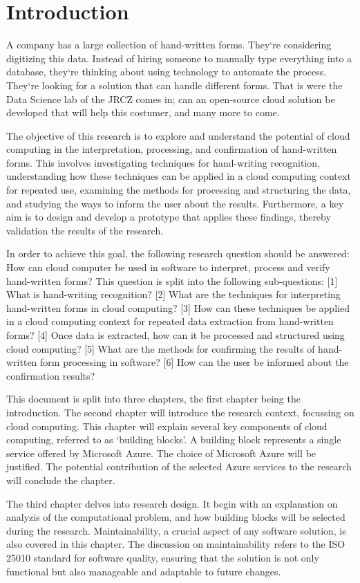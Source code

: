 \section{Introduction}

A company has a large collection of hand-written forms.
They`re considering digitizing this data.
Instead of hiring someone to manually type everything into a database,
they`re thinking about using technology to automate the process.
They`re looking for a solution that can handle different forms.
That is were the Data Science lab of the JRCZ comes in;
can an open-source cloud solution be developed that will help this costumer, and many more to come.

The objective of this research is to explore and understand the potential of cloud computing in the interpretation,
processing, and confirmation of hand-written forms.
This involves investigating techniques for hand-writing recognition,
understanding how these techniques can be applied in a cloud computing context for repeated use,
examining the methods for processing and structuring the data,
and studying the ways to inform the user about the results.
Furthermore, a key aim is to design and develop a prototype that applies these findings,
thereby validation the results of the research.

In order to achieve this goal, the following research question should be answered:
How can cloud computer be used in software to interpret, process and verify hand-written forms?
This question is split into the following sub-questions:
[1] What is hand-writing recognition?
[2] What are the techniques for interpreting hand-written forms in cloud computing?
[3] How can these techniques be applied in a cloud computing context for repeated data extraction from hand-written forms?
[4] Once data is extracted, how can it be processed and structured using cloud computing?
[5] What are the methods for confirming the results of hand-written form processing in software?
[6] How can the user be informed about the confirmation results?

This document is split into three chapters, the first chapter being the introduction.
The second chapter will introduce the research context, focussing on cloud computing.
This chapter will explain several key components of cloud computing, referred to as `building blocks'.
A building block represents a single service offered by Microsoft Azure.
The choice of Microsoft Azure will be justified.
The potential contribution of the selected Azure services to the research will conclude the chapter.

The third chapter delves into research design.
It begin with an explanation on analyzis of the computational problem,
and how building blocks will be selected during the research.
Maintainability, a crucial aspect of any software solution, is also covered in this chapter.
The discussion on maintainability refers to the ISO 25010 standard for software quality,
ensuring that the solution is not only functional but also manageable and adaptable to future changes.